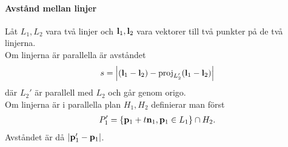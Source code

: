 \proof

\paragraph{Avstånd mellan linjer}
Låt $L_1, L_2$ vara två linjer och $\vect{l}_1, \vect{l}_2$ vara vektorer till två punkter på de två linjerna. \\
Om linjerna är parallella är avståndet
\begin{align*}
	s = \abs{(\vect{l}_1 - \vect{l}_2) - \proj{L_2'}{\vect{l}_1 - \vect{l}_2}}
\end{align*}
där $L_2'$ är parallell med $L_2$ och går genom origo. \\
Om linjerna är i parallella plan $H_1, H_2$ definierar man först
\begin{align*}
	P_1' = \{\vect{p}_1 + t\vect{n}_1, \vect{p}_1\in L_1\}\cap H_2.
\end{align*}
Avståndet är då $\abs{\vect{p}_1' - \vect{p}_1}$.

\proof